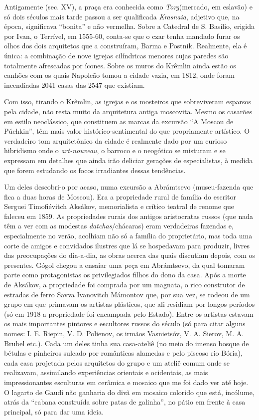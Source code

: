 Antigamente (sec. XV), a praça era conhecida como \emph{Torg}(mercado,
em eslavão) e só dois séculos mais tarde passou a ser qualificada
\emph{Krasnaia}, adjetivo que, na época, significava ``bonita'' e não
vermelha. Sobre a Catedral de S. Basílio, erigida por Ivan, o Terrível,
em 1555-60, conta-se que o czar tenha mandado furar os olhos dos dois
arquitetos que a construíram, Barma e Postnik. Realmente, ela é única: a
combinação de nove igrejas cilíndricas menores cujas paredes são
totalmente afrescadas por ícones. Sobre os muros do Krêmlin ainda estão
os canhões com os quais Napoleão tomou a cidade vazia, em 1812, onde
foram incendiadas 2041 casas das 2547 que existiam.

Com isso, tirando o Krêmlin, as igrejas e os mosteiros que sobreviveram
esparsos pela cidade, não resta muito da arquitetura antiga moscovita.
Mesmo os casarões em estilo neoclássico, que constituem as marcas da
excursão ``A Moscou de Púchkin'', têm mais valor histórico-sentimental
do que propriamente artístico. O verdadeiro tom arquitetônico da cidade
é realmente dado por um curioso hibridismo onde o \emph{art-nouveau}, o
barroco e o neogótico se misturam e se expressam em detalhes que ainda
irão deliciar gerações de especialistas, à medida que forem estudando os
focos irradiantes dessas tendências.

Um deles descobri-o por acaso, numa excursão a Abrámtsevo (museu-fazenda
que fica a duas horas de Moscou). Era a propriedade rural de família do
escritor Serguei Timofiévitch Aksákov, memorialista e crítico teatral de
renome que faleceu em 1859. As propriedades rurais dos antigos
aristocratas russos (que nada têm a ver com as modestas
\emph{datchas}/chácaras) eram verdadeiras fazendas e, especialmente no
verão, acolhiam não só a família do proprietário, mas toda uma corte de
amigos e convidados ilustres que lá se hospedavam para produzir, livres
das preocupações do dia-a-dia, as obras acerca das quais discutiam
depois, com os presentes. Gógol chegou a ensaiar uma peça em Abrámtsevo,
da qual tomaram parte como protagonistas os privilegiados filhos do dono
da casa. Após a morte de Aksákov, a propriedade foi comprada por um
magnata, o rico construtor de estradas de ferro Savva Ivanovitch
Mámontov que, por sua vez, se rodeou de um grupo em que primavam os
artistas plásticos, que ali residiam por longos períodos (só em 1918 a
propriedade foi encampada pelo Estado). Entre os artistas estavam os
mais importantes pintores e escultores russos do século (só para citar
alguns nomes: I. E. Riepin, V. D. Polienov, os irmãos Vasnietsóv, V. A.
Sierov, M. A. Brubel etc.). Cada um deles tinha sua casa-ateliê (no meio
do imenso bosque de bétulas e pinheiros sulcado por românticas alamedas
e pelo piscoso rio Bória), cada casa projetada pelos arquitetos do grupo
e um ateliê comum onde se realizavam, assimilando experiências orientais
e ocidentais, as mais impressionantes esculturas em cerâmica e mosaico
que me foi dado ver até hoje. O lagarto de Gaudí não ganharia do divã em
mosaico colorido que está, incólume, atrás da ``cabana construída sobre
patas de galinha'', no pátio em frente à casa principal, só para dar uma
ideia.

